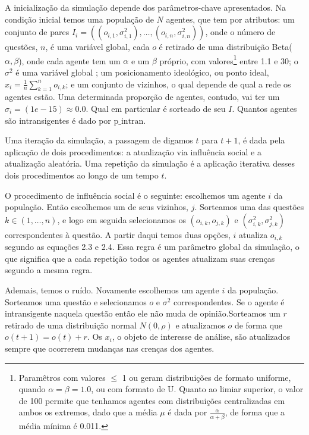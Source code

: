 A inicialização da simulação depende dos parâmetros-chave apresentados. Na
condição inicial temos uma população de \(N\) agentes, que tem por atributos: um
conjunto de pares \(I_i = ((o_{i,1},\sigma_{i,1}^2), \ldots, (o_{i,n},\sigma_{i,n}^2))\), onde
o número de questões, \(n\), é uma variável global, cada \(o\) é retirado de uma
distribuição Beta(\(\alpha,\beta\)), onde cada agente tem um \(\alpha\) e um \(\beta\) próprio,
com valores\footnote{Paramêtros com valores \(\leq\) 1 ou geram distribuições de
  formato uniforme, quando \(\alpha = \beta = 1.0\), ou com formato de U. Quanto ao
  limiar superior, o valor de 100 permite que tenhamos agentes com distribuições
  centralizadas em ambos os extremos, dado que a média \(\mu\) é dada por
  \(\frac{\alpha}{\alpha + \beta}\), de forma que a média mínima é 0.011.} entre 1.1 e 30; o
\(\sigma^2\) é uma variável global ; um posicionamento ideológico, ou ponto ideal,
\(x_i = \frac{1}{n} \sum_{k = 1}^n o_{i,k} \); e um conjunto de vizinhos, o qual
depende de qual a rede os agentes estão. Uma determinada proporção de agentes,
contudo, vai ter um \(\sigma_i = (1e-15 ) \approx 0.0 \). Qual em particular é sorteado de
seu \(I\). Quantos agentes são intransigentes é dado por \(\text{p\_intran}\).

Uma iteração da simulação, a passagem de digamos \(t\) para \(t+1\), é dada pela
aplicação de dois procedimentos: a atualização via influência social e a
atualização aleatória. Uma repetição da simulação é a aplicação iterativa desses
dois procedimentos ao longo de um tempo \(t \).

O procedimento de influência social é o seguinte: escolhemos um agente \(i\) da
população. Então escolhemos um de seus vizinhos, \(j\). Sorteamos uma das
questões \(k \in (1,\ldots,n)\), e logo em seguida selecionamos os
\((o_{i,k},o_{j,k})\) e \((\sigma_{i,k}^2,\sigma_{j,k}^2)\) correspondentes à questão. A
partir daqui temos duas opções, \(i\) atualiza \(o_{i,k}\) segundo as equações
2.3 e 2.4. Essa regra é um parâmetro global da simulação, o que significa que a
cada repetição todos os agentes atualizam suas crenças segundo a mesma regra.

Ademais, temos o ruído. Novamente escolhemos um agente \(i\) da população.
Sorteamos uma questão e selecionamos \(o\) e \(\sigma^2\) correspondentes. Se o
agente é intransigente naquela questão então ele não muda de opinião.Sorteamos
um \(r\) retirado de uma distribuição normal \(N(0,\rho)\) e atualizamos \(o\) de
forma que \(o(t+1) = o(t) + r\). Os \(x_i\), o objeto de interesse de análise,
são atualizados sempre que ocorrerem mudanças nas crenças dos agentes.

